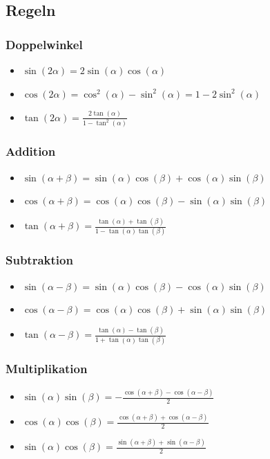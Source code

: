 \documentclass[a4paper,10pt]{article}
\begin{document}
\subsection{Regeln}

\subsubsection{Doppelwinkel}
\begin{itemize}
 \item $\sin(2\alpha) = 2 \sin(\alpha) \cos(\alpha)$
 \item $\cos(2\alpha) = \cos^2(\alpha) - \sin^2(\alpha) = 1 - 2 \sin^2(\alpha)$
 \item $\tan(2\alpha) = \frac{2\tan(\alpha)}{1 - \tan^2(\alpha)}$
\end{itemize}

\subsubsection{Addition}
\begin{itemize}
 \item $\sin(\alpha + \beta) = \sin(\alpha) \cos(\beta) + \cos(\alpha) \sin(\beta)$
 \item $\cos(\alpha + \beta) = \cos(\alpha) \cos(\beta) - \sin(\alpha) \sin(\beta)$
 \item $\tan(\alpha + \beta) = \frac{\tan(\alpha) + \tan(\beta)}{1 - \tan(\alpha) \tan(\beta)}$
\end{itemize}

\subsubsection{Subtraktion}
\begin{itemize}
 \item $\sin(\alpha - \beta) = \sin(\alpha) \cos(\beta) - \cos(\alpha)\sin(\beta)$
 \item $\cos(\alpha - \beta) = \cos(\alpha) \cos(\beta) + \sin(\alpha)\sin(\beta)$
 \item $\tan(\alpha - \beta) = \frac{\tan(\alpha) - \tan(\beta)}{1+\tan(\alpha) \tan(\beta)}$
\end{itemize}

\subsubsection{Multiplikation}
\begin{itemize}
 \item $\sin(\alpha) \sin(\beta) = -\frac{\cos(\alpha + \beta) - \cos(\alpha - \beta)}{2}$
 \item $\cos(\alpha) \cos(\beta) =  \frac{\cos(\alpha + \beta) + \cos(\alpha - \beta)}{2}$
 \item $\sin(\alpha) \cos(\beta) =  \frac{\sin(\alpha + \beta) + \sin(\alpha - \beta)}{2}$
\end{itemize}
\end{document}
